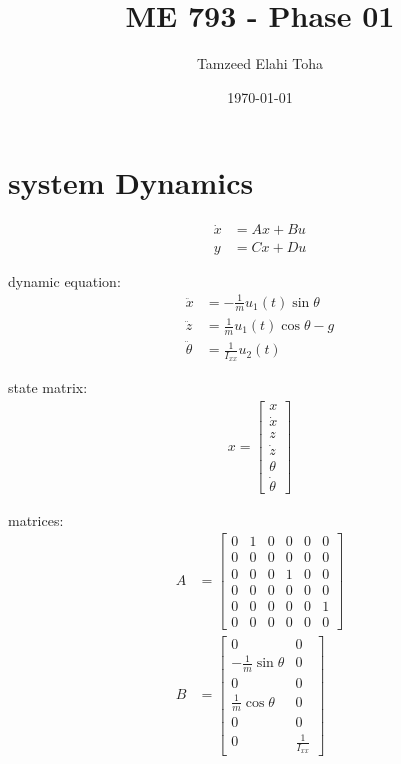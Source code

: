 \documentclass[12pt]{article}
\title{ME 793 - Phase 01}
\author{Tamzeed Elahi Toha}
\date{\today}
\begin{document}
\maketitle

\section*{system Dynamics} 

\begin{align*}
    \dot{x} &= Ax + Bu \\
    y &= Cx + Du
\end{align*}

dynamic equation:
\begin{align*}
    \ddot{x} &= -\frac{1}{m} u_1(t) \sin{\theta} \\
    \ddot{z} &= \frac{1}{m} u_1(t) \cos{\theta} - g \\
    \ddot{\theta} &= \frac{1}{I_{xx}}u_2(t)
\end{align*}

state matrix:
\begin{align*}
    x = \begin{bmatrix}
        x \\
        \dot{x} \\
        z \\
        \dot{z} \\
        \theta \\
        \dot{\theta}
    \end{bmatrix}
\end{align*}

matrices:
\begin{align*}
    A &= \begin{bmatrix}
        0 & 1 & 0 & 0 & 0 & 0 \\
        0 & 0 & 0 & 0 & 0 & 0 \\
        0 & 0 & 0 & 1 & 0 & 0 \\
        0 & 0 & 0 & 0 & 0 & 0 \\
        0 & 0 & 0 & 0 & 0 & 1 \\
        0 & 0 & 0 & 0 & 0 & 0
    \end{bmatrix} \\
    B &= \begin{bmatrix}
        0 & 0 \\
        - \frac{1}{m} \sin{\theta} & 0 \\
        0 & 0 \\
        \frac{1}{m} \cos{\theta} & 0 \\
        0 & 0 \\
        0 & \frac{1}{I_{xx}}
    \end{bmatrix} \\
\end{align*}
\end{document}
